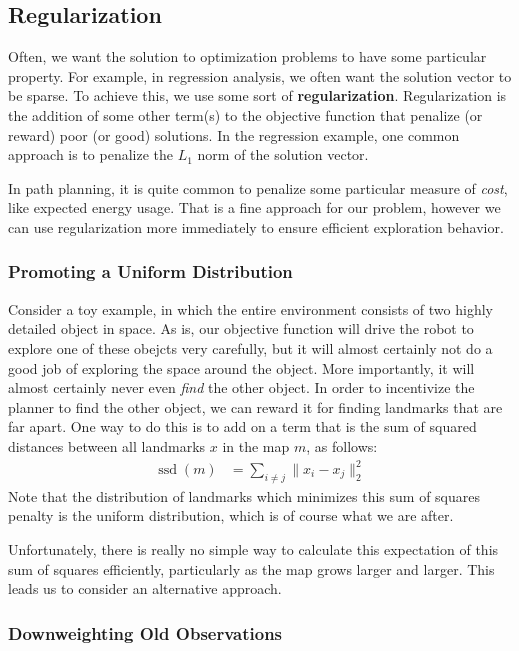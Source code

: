 \documentclass[12pt]{article}
\DeclareMathOperator{\ssd}{ssd}
\begin{document}
\subsection{Regularization}

Often, we want the solution to optimization problems to have some particular property. For example, in regression analysis, we often want the solution vector to be sparse. To achieve this, we use some sort of \textbf{regularization}. Regularization is the addition of some other term(s) to the objective function that penalize (or reward) poor (or good) solutions. In the regression example, one common approach is to penalize the $L_1$ norm of the solution vector.

In path planning, it is quite common to penalize some particular measure of \textit{cost}, like expected energy usage. That is a fine approach for our problem, however we can use regularization more immediately to ensure efficient exploration behavior.

\subsubsection{Promoting a Uniform Distribution}

Consider a toy example, in which the entire environment consists of two highly detailed object in space. As is, our objective function will drive the robot to explore one of these obejcts very carefully, but it will almost certainly not do a good job of exploring the space around the object. More importantly, it will almost certainly never even \textit{find} the other object. In order to incentivize the planner to find the other object, we can reward it for finding landmarks that are far apart. One way to do this is to add on a term that is the sum of squared distances between all landmarks $x$ in the map $m$, as follows:
\begin{align}
  \ssd(m) &= \sum_{i \ne j} \|x_i - x_j\|_2^2
\end{align}
Note that the distribution of landmarks which minimizes this sum of squares penalty is the uniform distribution, which is of course what we are after.

Unfortunately, there is really no simple way to calculate this expectation of this sum of squares efficiently, particularly as the map grows larger and larger. This leads us to consider an alternative approach.

\subsubsection{Downweighting Old Observations}
\end{document}
